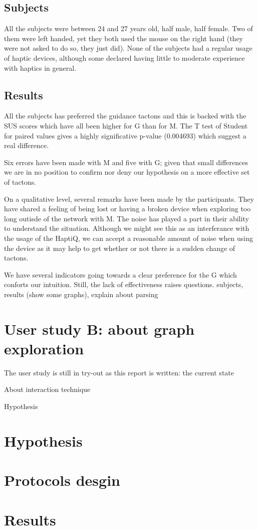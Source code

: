 \subsection{Subjects}\label{subjects}

All the subjects were between 24 and 27 years old, half male, half
female. Two of them were left handed, yet they both used the mouse on
the right hand (they were not asked to do so, they just did). None of
the subjects had a regular usage of haptic devices, although some
declared having little to moderate experience with haptics in general.

\subsection{Results}\label{results}

All the subjects has preferred the guidance tactons and this is backed
with the SUS scores which have all been higher for G than for M. The T
test of Student for paired values gives a highly significative p-value
(0.004693) which suggest a real difference.

Six errors have been made with M and five with G; given that small
differences we are in no position to confirm nor deny our hypothesis on
a more effective set of tactons.

On a qualitative level, several remarks have been made by the
participants. They have shared a feeling of being lost or having a
broken device when exploring too long outisde of the network with M. The
noise has played a part in their ability to understand the situation.
Although we might see this as an interferance with the usage of the
HaptiQ, we can accept a reasonable amount of noise when using the device
as it may help to get whether or not there is a sudden change of
tactons.

We have several indicators going towards a clear preference for the G
which conforts our intuition. Still, the lack of effectiveness raises
questions. subjects, results (show some graphs), explain about parsing

\section{User study B: about graph
exploration}\label{user-study-b-about-graph-exploration}

The user study is still in try-out as this report is written: the
current state

About interaction technique

Hypothesis

\section{Hypothesis}\label{hypothesis-1}

\section{Protocols desgin}\label{protocols-desgin}

\section{Results}\label{results-1}

